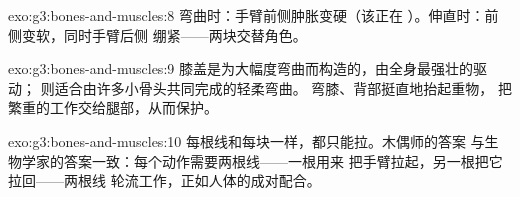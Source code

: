 \begin{solution}{exo:g3:bones-and-muscles:8}
弯曲时：手臂前侧肿胀变硬（该正在
）。伸直时：前侧变软，同时手臂后侧
绷紧——两块交替角色。
\end{solution}

\begin{solution}{exo:g3:bones-and-muscles:9}
膝盖是为大幅度弯曲而构造的，由全身最强壮的驱动；
则适合由许多小骨头共同完成的轻柔弯曲。
弯膝、背部挺直地抬起重物，
把繁重的工作交给腿部，从而保护。
\end{solution}

\begin{solution}{exo:g3:bones-and-muscles:10}
每根线和每块一样，都只能拉。木偶师的答案
与生物学家的答案一致：每个动作需要两根线——一根用来
把手臂拉起，另一根把它拉回——两根线
轮流工作，正如人体的成对配合。
\end{solution}
